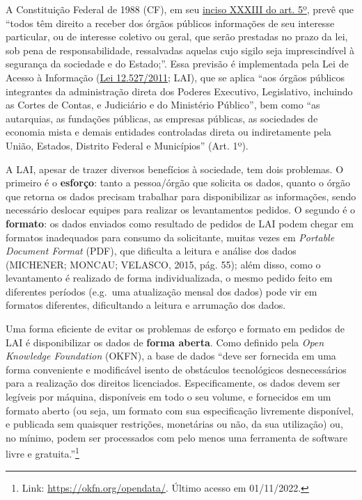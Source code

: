 \documentclass[12pt,twoside,brazilian]{book}
\begin{document}
A Constituição Federal de 1988 (CF), em seu
\href{https://constituicao.stf.jus.br/dispositivo/cf-88-parte-1-titulo-2-capitulo-1-artigo-5-inciso-33}{inciso
XXXIII do art. 5º}, prevê que ``todos têm direito a receber dos órgãos
públicos informações de seu interesse particular, ou de interesse
coletivo ou geral, que serão prestadas no prazo da lei, sob pena de
responsabilidade, ressalvadas aquelas cujo sigilo seja imprescindível à
segurança da sociedade e do Estado;''. Essa previsão é implementada pela
Lei de Acesso à Informação
(\href{https://www.planalto.gov.br/ccivil_03/_ato2011-2014/2011/lei/l12527.htm}{Lei
12.527/2011}; LAI), que se aplica ``aos órgãos públicos integrantes da
administração direta dos Poderes Executivo, Legislativo, incluindo as
Cortes de Contas, e Judiciário e do Ministério Público'', bem como ``as
autarquias, as fundações públicas, as empresas públicas, as sociedades
de economia mista e demais entidades controladas direta ou indiretamente
pela União, Estados, Distrito Federal e Municípios'' (Art. 1º).

A LAI, apesar de trazer diversos benefícios à sociedade, tem dois
problemas. O primeiro é o \textbf{esforço}: tanto a pessoa/órgão que
solicita os dados, quanto o órgão que retorna os dados precisam
trabalhar para disponibilizar as informações, sendo necessário deslocar
equipes para realizar os levantamentos pedidos. O segundo é o
\textbf{formato}: os dados enviados como resultado de pedidos de LAI
podem chegar em formatos inadequados para consumo da solicitante, muitas
vezes em \emph{Portable Document Format} (PDF), que dificulta a leitura
e análise dos dados (MICHENER; MONCAU; VELASCO, 2015, pág. 55); além
disso, como o levantamento é realizado de forma individualizada, o mesmo
pedido feito em diferentes períodos (e.g.~uma atualização mensal dos
dados) pode vir em formatos diferentes, dificultando a leitura e
arrumação dos dados.

Uma forma eficiente de evitar os problemas de esforço e formato em
pedidos de LAI é disponibilizar os dados de \textbf{forma aberta}. Como
definido pela \emph{Open Knowledge Foundation} (OKFN), a base de dados
``deve ser fornecida em uma forma conveniente e modificável isento de
obstáculos tecnológicos desnecessários para a realização dos direitos
licenciados. Especificamente, os dados devem ser legíveis por máquina,
disponíveis em todo o seu volume, e fornecidos em um formato aberto (ou
seja, um formato com sua especificação livremente disponível, e
publicada sem quaisquer restrições, monetárias ou não, da sua
utilização) ou, no mínimo, podem ser processados com pelo menos uma
ferramenta de software livre e gratuita.''\footnote{Link:
  \url{https://okfn.org/opendata/}. Último acesso em 01/11/2022.}
\end{document}
